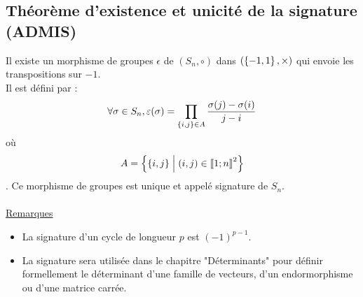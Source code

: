 \subsection{Théorème d’existence et unicité de la signature (ADMIS)}
\begin{theo}
    Il existe un morphisme de groupes \(\epsilon\) de \((S_n, \circ)\) dans \((\left\lbrace-1, 1\right\rbrace, \times)\) qui envoie les transpositions sur \(-1\).\\
    Il est défini par :
    \[\forall\sigma \in S_n, \varepsilon(\sigma) = \prod_{\left\lbrace i,j\right\rbrace\in A} \frac{\sigma(j) - \sigma(i)}{j - i}\]
    où
    \[A = \left\lbrace\left\lbrace i, j\right\rbrace \;\middle|\; (i, j) \in \left\llbracket1;n\right\rrbracket^2\right\rbrace\] .
    Ce morphisme de groupes est unique et appelé signature de \(S_n\).\\~\\
    \underline{Remarques}\\
    \begin{itemize}
        \item La signature d’un cycle de longueur \(p\) est \((-1)^{p-1}\).
        \item La signature sera utilisée dans le chapitre "Déterminants" pour définir formellement le déterminant d’une famille de vecteurs, d’un endormorphisme ou d’une matrice carrée.
    \end{itemize}
\end{theo}

